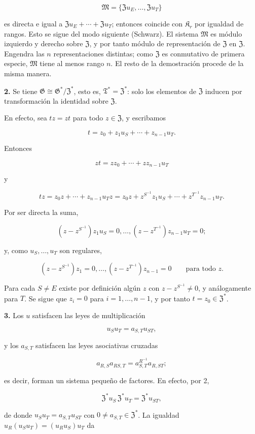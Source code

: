\[
\mathfrak M=\{\mathfrak Zu_E,\ldots,\mathfrak Zu_T\}
\]

es directa e igual a $\mathfrak Zu_E+\cdots+\mathfrak Zu_T$; entonces coincide con $\mathfrak K_r$ por igualdad de rangos. Esto se sigue del modo siguiente (Schwarz). El sistema $\mathfrak M$ es módulo izquierdo y derecho sobre $\mathfrak Z$, y por tanto módulo de representación de $\mathfrak Z$ en $\mathfrak Z$. Engendra las $n$ representaciones distintas; como $\mathfrak Z$ es conmutativo de primera especie, $\mathfrak M$ tiene al menos rango $n$. El resto de la demostración procede de la misma manera.

\noindent\textbf{2.} Se tiene $\mathfrak G\cong\mathfrak G^*/\mathfrak Z^*$, esto es, $\mathfrak T^*=\mathfrak Z^*$: solo los elementos de $\mathfrak Z$ inducen por transformación la identidad sobre $\mathfrak Z$.

En efecto, sea $tz=zt$ para todo $z\in\mathfrak Z$, y escribamos

\[
t=z_0+z_1u_S+\cdots+z_{n-1}u_T.
\]

Entonces

\[
zt=zz_0+\cdots+zz_{n-1}u_T
\]

y

\[
tz=z_0z+\cdots+z_{n-1}u_Tz
=z_0z+z^{S^{-1}}z_1u_S+\cdots+z^{T^{-1}}z_{n-1}u_T.
\]

Por ser directa la suma,

\[
(z-z^{S^{-1}})z_1u_S=0,\ldots,
(z-z^{T^{-1}})z_{n-1}u_T=0;
\]

y, como $u_S,\ldots,u_T$ son regulares,

\[
(z-z^{S^{-1}})z_1=0,\ldots,
(z-z^{T^{-1}})z_{n-1}=0
\qquad\text{para todo }z.
\]

Para cada $S\ne E$ existe por definición algún $z$ con $z-z^{S^{-1}}\ne0$, y análogamente para $T$. Se sigue que $z_i=0$ para $i=1,\ldots,n-1$, y por tanto $t=z_0\in\mathfrak Z^*$.

\noindent\textbf{3.} Los $u$ satisfacen las leyes de multiplicación

\[
u_Su_T=a_{S,T}u_{ST},
\]

y los $a_{S,T}$ satisfacen las leyes asociativas cruzadas

\[
a_{R,S}a_{RS,T}=a_{S,T}^{R^{-1}}a_{R,ST};
\]

es decir, forman un sistema pequeño de factores. En efecto, por 2,

\[
\mathfrak Z^*u_S\,\mathfrak Z^*u_T=\mathfrak Z^*u_{ST},
\]

de donde $u_Su_T=a_{S,T}u_{ST}$ con $0\ne a_{S,T}\in\mathfrak Z^*$. La igualdad $u_R(u_Su_T)=(u_Ru_S)u_T$ da

